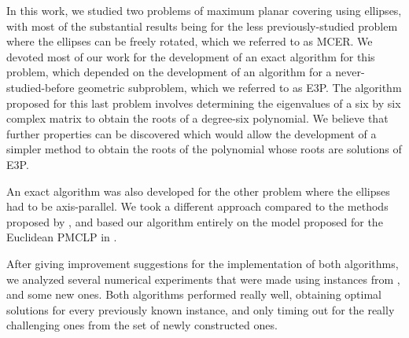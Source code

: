 In this work, we studied two problems of maximum planar covering using ellipses, with most of the substantial results being for the less previously-studied problem where the ellipses can be freely rotated, which we referred to as MCER. 
We devoted most of our work for the development of an exact algorithm for this problem, which depended on the development of an algorithm for a never-studied-before geometric subproblem, which we referred to as E3P. The algorithm proposed for this last problem involves determining the eigenvalues of a six by six complex matrix to obtain the roots of a degree-six polynomial. We believe that further properties can be discovered which would allow the development of a simpler method to obtain the roots of the polynomial whose roots are solutions of E3P.

An exact algorithm was also developed for the other problem where the ellipses had to be axis-parallel. We took a different approach compared to the methods proposed by \cite{canbolat, andreta}, and based our algorithm entirely on the model proposed for the Euclidean PMCLP in \cite{church:1984}.

After giving improvement suggestions for the implementation of both algorithms, we analyzed several numerical experiments that were made using instances from \cite{canbolat, andreta}, and some new ones. Both algorithms performed really well, obtaining optimal solutions for every previously known instance, and only timing out for the really challenging ones from the set of newly constructed ones.